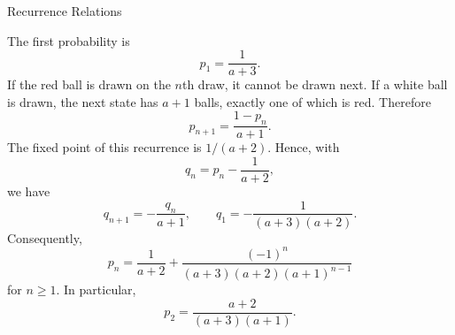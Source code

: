 \begin{expectedproblemgroup}{Recurrence Relations}
        \begin{expectedsubsolution}
            The first probability is
            \[
                p_1=\frac{1}{a+3}.
            \]
            If the red ball is drawn on the $n$th draw, it cannot be drawn next. If
            a white ball is drawn, the next state has $a+1$ balls, exactly one of
            which is red. Therefore
            \[
                p_{n+1}=\frac{1-p_n}{a+1}.
            \]
            The fixed point of this recurrence is $1/(a+2)$. Hence, with
            \[
                q_n=p_n-\frac{1}{a+2},
            \]
            we have
            \[
                q_{n+1}=-\frac{q_n}{a+1},
                \qquad
                q_1=-\frac{1}{(a+3)(a+2)}.
            \]
            Consequently,
            \[
                \boxed{
                    p_n
                    =
                    \frac{1}{a+2}
                    +
                    \frac{(-1)^n}{
                        (a+3)(a+2)(a+1)^{n-1}
                    }
                }
            \]
            for $n\geq1$. In particular,
            \[
                p_2=\frac{a+2}{(a+3)(a+1)}.
            \]
        \end{expectedsubsolution}

    \end{expectedproblemgroup}

